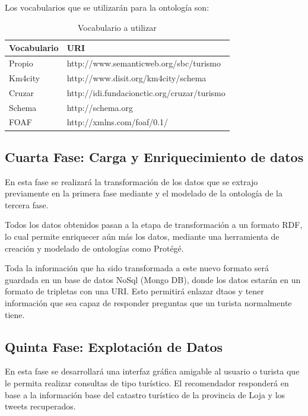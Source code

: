 \documentclass[lnbip,sechang,a4paper]{svmultln}
\begin{document}
Los vocabularios que se utilizarán para la ontología son:
\begin{table}[htbp]
\begin{center}
\begin{tabular}{|l|l|}
\hline
Vocabulario &  URI\\
\hline \hline
Propio & http://www.semanticweb.org/sbc/turismo  \\ \hline
Km4city & http://www.disit.org/km4city/schema   \\ \hline
Cruzar & http://idi.fundacionctic.org/cruzar/turismo \\ \hline
Schema & http://schema.org \\ \hline
FOAF & http://xmlns.com/foaf/0.1/ \\ \hline
\end{tabular}
\caption{Vocabulario a utilizar}
\label{tabla:sencilla}
\end{center}
\end{table}

\subsection{Cuarta Fase: Carga y Enriquecimiento de datos}
En esta fase se realizará la transformación de los datos que se extrajo previamente en la primera fase mediante y  el modelado de la ontología de la tercera fase. 

Todos los datos obtenidos pasan a la etapa de transformación a un formato RDF, lo cual permite enriquecer aún más los datos, mediante una herramienta de creación y modelado de ontologías como Protégé.

Toda la información que ha sido transformada a este nuevo formato será guardada en un base de datos NoSql (Mongo DB), donde los datos estarán en un formato de tripletas con una URI. Esto permitirá enlazar dtaos y tener información  que sea capaz de responder preguntas que un turista normalmente tiene. 

\subsection{Quinta Fase: Explotación de Datos}
En esta fase se desarrollará una interfaz gráfica amigable al usuario o turista que le permita realizar consultas de tipo turístico. El recomendador responderá en base a la información base del catastro turístico de la provincia de Loja y los tweets recuperados.
 
\hfill \break
\end{document}
